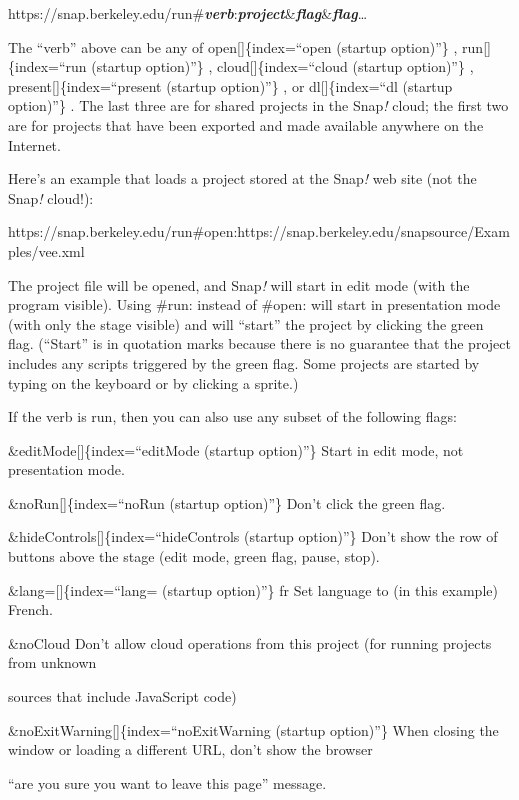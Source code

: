 \documentclass[
  letterpaper,
]{book}
\begin{document}
https://snap.berkeley.edu/run\#\textbf{\emph{verb}}:\textbf{\emph{project}}\&\textbf{\emph{flag}}\&\textbf{\emph{flag}}\ldots{}

The ``verb'' above can be any of open{[}{]}\{index=``open (startup
option)''\} , run{[}{]}\{index=``run (startup option)''\} ,
cloud{[}{]}\{index=``cloud (startup option)''\} ,
present{[}{]}\{index=``present (startup option)''\} , or
dl{[}{]}\{index=``dl (startup option)''\} . The last three are for
shared projects in the Snap\emph{!} cloud; the first two are for
projects that have been exported and made available anywhere on the
Internet.

Here's an example that loads a project stored at the Snap\emph{!} web
site (not the Snap\emph{!} cloud!):

https://snap.berkeley.edu/run\#open:https://snap.berkeley.edu/snapsource/Examples/vee.xml

The project file will be opened, and Snap\emph{!} will start in edit
mode (with the program visible). Using \#run: instead of \#open: will
start in presentation mode (with only the stage visible) and will
``start'' the project by clicking the green flag. (``Start'' is in
quotation marks because there is no guarantee that the project includes
any scripts triggered by the green flag. Some projects are started by
typing on the keyboard or by clicking a sprite.)

If the verb is run, then you can also use any subset of the following
flags:

\&editMode{[}{]}\{index=``editMode (startup option)''\} Start in edit
mode, not presentation mode.

\&noRun{[}{]}\{index=``noRun (startup option)''\} Don't click the green
flag.

\&hideControls{[}{]}\{index=``hideControls (startup option)''\} Don't
show the row of buttons above the stage (edit mode, green flag, pause,
stop).

\&lang={[}{]}\{index=``lang= (startup option)''\} fr Set language to (in
this example) French.

\&noCloud Don't allow cloud operations from this project (for running
projects from unknown

sources that include JavaScript code)

\&noExitWarning{[}{]}\{index=``noExitWarning (startup option)''\} When
closing the window or loading a different URL, don't show the browser

``are you sure you want to leave this page'' message.
\end{document}
